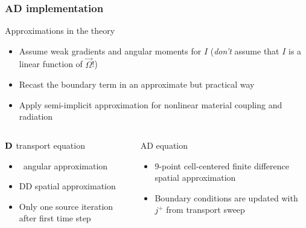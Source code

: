 \documentclass{beamer}
\begin{document}
\begin{frame}
  \frametitle{AD implementation}
  \begin{block}{Approximations in the theory}
    \begin{itemize}
      \item Assume weak gradients and angular moments for $I$ (\emph{don't}
        assume that $I$ is a linear function of $\vec{\Omega}$!)
      \item Recast the boundary term in an approximate but practical way
      \item Apply semi-implicit approximation for nonlinear material coupling
        and radiation
    \end{itemize}
  \end{block}
  \vspace{-\baselineskip}
  \begin{columns}[t]
    \begin{column}{.48\textwidth}
\begin{block}{$\mathbf{D}$ transport equation}
  \begin{itemize}
    \item \SN\ angular approximation
    \item DD spatial approximation
    \item Only one source iteration after first time step
  \end{itemize}
\end{block}
    \end{column}
    \begin{column}{.48\textwidth}
\begin{block}{AD equation}
  \begin{itemize}
    \item 9-point cell-centered finite difference spatial approximation
    \item Boundary conditions are updated with $j^+$ from transport sweep
  \end{itemize}
\end{block}
    \end{column}
  \end{columns}
\end{frame}

\end{document}
